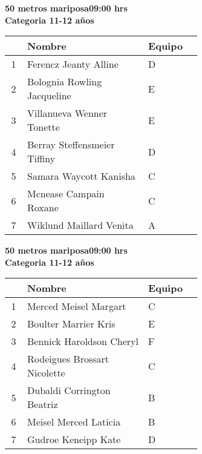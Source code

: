 \begin{minipage}{0.95\linewidth}\vspace{0.5cm} 
\begin{flushleft}
\textbf{
\hspace{-0.15cm}50 metros mariposa\hspace{1.5cm}09:00 hrs \\Categoria 11-12 años}\vspace{-0.2cm} 
\end{flushleft}
\begin{tabular}{cp{0.63\linewidth}l}
\hline
& \textbf{Nombre} & \textbf{Equipo} \\ \hline
1 & Ferencz Jeanty Alline & D \\ 
2 & Bolognia Rowling Jacqueline & E \\ 
3 & Villanueva Wenner Tonette & E \\ 
4 & Berray Steffensmeier Tiffiny & D \\ 
5 & Samara Waycott Kanisha & C \\ 
6 & Mcnease Campain Roxane & C \\ 
7 & Wiklund Maillard Venita & A \\ 
\end{tabular}
\end{minipage}
\begin{minipage}{0.95\linewidth}\vspace{0.5cm} 
\begin{flushleft}
\textbf{
\hspace{-0.15cm}50 metros mariposa\hspace{1.5cm}09:00 hrs \\Categoria 11-12 años}\vspace{-0.2cm} 
\end{flushleft}
\begin{tabular}{cp{0.63\linewidth}l}
\hline
& \textbf{Nombre} & \textbf{Equipo} \\ \hline
1 & Merced Meisel Margart & C \\ 
2 & Boulter Marrier Kris & E \\ 
3 & Bennick Haroldson Cheryl & F \\ 
4 & Rodeigues Brossart Nicolette & C \\ 
5 & Dubaldi Corrington Beatriz & B \\ 
6 & Meisel Merced Laticia & B \\ 
7 & Gudroe Keneipp Kate & D \\ 
\end{tabular}
\end{minipage}

